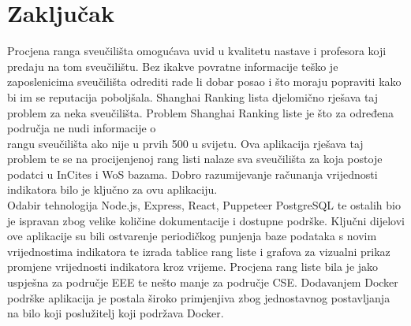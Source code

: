 \documentclass[times, utf8, zavrsni]{fer}
\begin{document}
\chapter{Zaključak}
Procjena ranga sveučilišta omogućava uvid u kvalitetu nastave i profesora koji predaju na tom sveučilištu. Bez ikakve povratne informacije 
teško je zaposlenicima sveučilišta odrediti rade li dobar posao i što moraju popraviti kako bi im se reputacija poboljšala.
Shanghai Ranking lista djelomično rješava taj problem za neka sveučilišta. Problem Shanghai Ranking liste je što za određena područja ne nudi 
informacije o \\rangu sveučilišta ako nije u prvih 500 u svijetu. Ova aplikacija rješava taj problem te se na procijenjenoj rang listi nalaze sva sveučilišta 
za koja postoje podatci u InCites i WoS bazama. Dobro razumijevanje računanja vrijednosti indikatora bilo je ključno za ovu aplikaciju.
\\Odabir tehnologija Node.js, Express, React, Puppeteer PostgreSQL te ostalih bio je ispravan zbog velike količine dokumentacije i dostupne podrške. Ključni dijelovi 
ove aplikacije su bili ostvarenje periodičkog punjenja baze podataka s novim vrijednostima indikatora te izrada tablice rang liste i grafova za vizualni prikaz promjene vrijednosti indikatora kroz vrijeme. 
Procjena rang liste bila je jako uspješna za područje EEE te nešto manje za područje CSE.
Dodavanjem Docker podrške aplikacija je postala široko primjenjiva zbog jednostavnog postavljanja na bilo koji poslužitelj koji podržava Docker.



\nocite{*}
\end{document}
